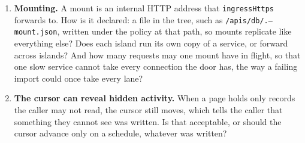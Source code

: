 \begin{enumerate}
  fills is a view the UI builds from the seats in their token.
\item \textbf{Mounting.} A mount is an internal HTTP address that
  \texttt{ingressHttps} forwards to. How is it declared: a file in the tree, such
  as \texttt{/apis/db/.--mount.json}, written under the policy at that path, so
  mounts replicate like everything else? Does each island run its own copy of a
  service, or forward across islands? And how many requests may one mount have in
  flight, so that one slow service cannot take every connection the door has,
  the way a failing import could once take every lane?
\item \textbf{The cursor can reveal hidden activity.} When a page holds only
  records the caller may not read, the cursor still moves, which tells the caller
  that something they cannot see was written. Is that acceptable, or should the
  cursor advance only on a schedule, whatever was written?
\end{enumerate}

